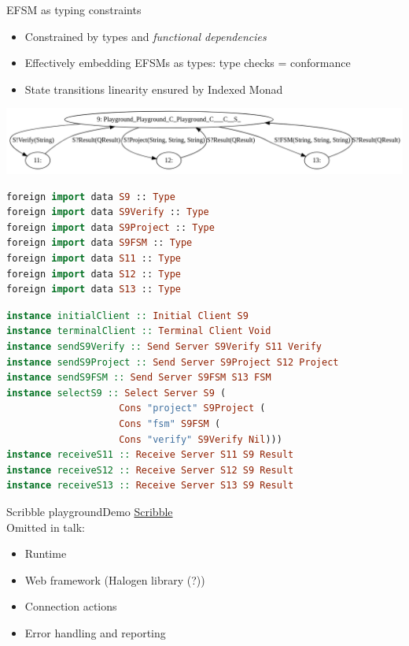 \documentclass[aspectratio=1610]{beamer}
\begin{document}
\begin{frame}[fragile]{EFSM as typing constraints}
  \begin{itemize}
    \item Constrained by types and \textit{functional dependencies}
    \item Effectively embedding EFSMs as types: type checks = conformance
    \item State transitions linearity ensured by Indexed Monad
  \end{itemize}
  \begin{center}
  \includegraphics[width=0.8\linewidth]{fsm.png}
  \end{center}
  \begin{minipage}{0.40\linewidth}
  \begin{lstlisting}[language=PureScript,style=hask,basicstyle=\tiny\ttfamily]
foreign import data S9 :: Type
foreign import data S9Verify :: Type
foreign import data S9Project :: Type
foreign import data S9FSM :: Type
foreign import data S11 :: Type
foreign import data S12 :: Type
foreign import data S13 :: Type
  \end{lstlisting}
  \end{minipage}
  \begin{minipage}{0.56\linewidth}
  \begin{lstlisting}[language=PureScript,style=hask,basicstyle=\tiny\ttfamily]
instance initialClient :: Initial Client S9
instance terminalClient :: Terminal Client Void
instance sendS9Verify :: Send Server S9Verify S11 Verify
instance sendS9Project :: Send Server S9Project S12 Project
instance sendS9FSM :: Send Server S9FSM S13 FSM
instance selectS9 :: Select Server S9 (
                    Cons "project" S9Project (
                    Cons "fsm" S9FSM (
                    Cons "verify" S9Verify Nil)))
instance receiveS11 :: Receive Server S11 S9 Result
instance receiveS12 :: Receive Server S12 S9 Result
instance receiveS13 :: Receive Server S13 S9 Result
  \end{lstlisting}
  \end{minipage}
\end{frame}

\begin{frame}{Scribble playground}{Demo}
  \href{http://127.0.0.1:8100/}{Scribble}
  \\[2ex]
  Omitted in talk:
  \begin{itemize}
    \item Runtime
    \item Web framework (Halogen library (?))
    \item Connection actions
    \item Error handling and reporting
  \end{itemize}
\end{frame}
\end{document}
